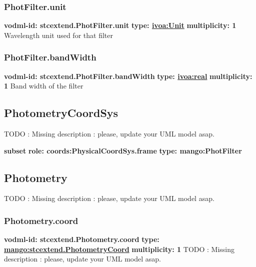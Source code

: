     \subsubsection{PhotFilter.unit}
      \textbf{vodml-id: stcextend.PhotFilter.unit} \newline
      \textbf{type: \hyperref[sect:ivoa]{ivoa:Unit}} \newline
      \textbf{multiplicity: 1} \newline 
      Wavelength unit used for that filter

    \subsubsection{PhotFilter.bandWidth}
      \textbf{vodml-id: stcextend.PhotFilter.bandWidth} \newline
      \textbf{type: \hyperref[sect:ivoa]{ivoa:real}} \newline
      \textbf{multiplicity: 1} \newline 
      Band width of the filter


  \subsection{PhotometryCoordSys}
  \label{sect:PhotometryCoordSys}
    TODO : Missing description : please, update your UML model asap.

    \noindent \textbf{subset} \newline
    \indent   \textbf{role: coords:PhysicalCoordSys.frame} \newline
    \indent   \textbf{type: mango:PhotFilter} \newline


  \subsection{Photometry}
  \label{sect:stcextend.Photometry}
    TODO : Missing description : please, update your UML model asap.

    \subsubsection{Photometry.coord}
      \textbf{vodml-id: stcextend.Photometry.coord} \newline
      \textbf{type: \hyperref[sect:stcextend.PhotometryCoord]{mango:stcextend.PhotometryCoord}} \newline
      \textbf{multiplicity: 1} \newline 
      TODO : Missing description : please, update your UML model asap.

